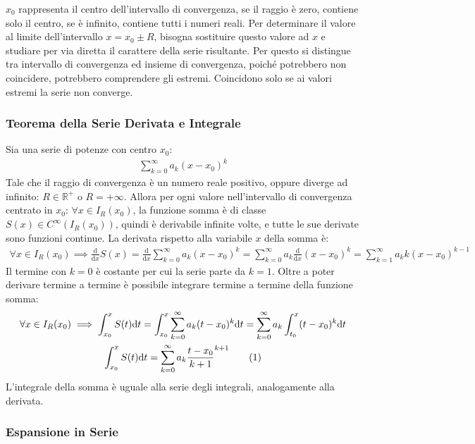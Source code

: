 \documentclass{article}
\numberwithin{equation}{subsection}
\newcommand{\tageq}{\tag{\stepcounter{equation}\theequation}}
\begin{document}
$x_0$ rappresenta il centro dell'intervallo di convergenza, se il raggio è zero, contiene solo il centro, se è infinito, contiene tutti i numeri reali. 
Per determinare il valore al limite dell'intervallo $x=x_0\pm R$, bisogna sostituire questo valore ad $x$ e studiare per via diretta il carattere della serie risultante. Per questo si distingue tra intervallo di convergenza ed insieme di convergenza, poiché potrebbero non coincidere, potrebbero comprendere gli estremi. Coincidono solo se ai valori estremi la serie non converge. 

\subsubsection{Teorema della Serie Derivata e Integrale}

Sia una serie di potenze con centro $x_0$:
\begin{gather*}
    \displaystyle\sum_{k=0}^\infty a_k(x-x_0)^k
\end{gather*}
Tale che il raggio di convergenza è un numero reale positivo, oppure diverge ad infinito: $R\in\mathbb{R}^+$ o $R=+\infty$. 
Allora per ogni valore nell'intervallo di convergenza centrato in $x_0$: 
$\forall x\in I_R(x_0)$, la funzione somma è di classe $S(x)\in C^{\infty}(I_R(x_0))$, quindi è derivabile infinite volte, e tutte le sue derivate sono funzioni continue. La derivata rispetto alla variabile $x$ della somma è:
\begin{gather}
    \forall x \in I_R(x_0)\implies\displaystyle\frac{\mathrm{d}}{\mathrm{d}x}S(x)=
    \frac{\mathrm{d}}{\mathrm{d}x}\sum_{k=0}^\infty a_k(x-x_0)^k=
    \sum_{k=0}^\infty a_k\frac{\mathrm{d}}{\mathrm{d}x}(x-x_0)^k=
    \sum_{k=1}^\infty a_kk(x-x_0)^{k-1}
\end{gather}
Il termine con $k=0$ è costante per cui la serie parte da $k=1$.
Oltre a poter derivare termine a termine è possibile integrare termine a termine della funzione somma:
\begin{gather*}
    \forall x\in I_R(x_0)\implies\displaystyle\int_{x_0}^xS(t)\mathrm{d}t=\int_{x_0}^x\sum_{k=0}^\infty a_k(t-x_0)^k\mathrm{d}t=\sum_{k=0}^\infty a_k\int_{t_0}^x(t-x_0)^k\mathrm{d}t\\
    \displaystyle\int_{x_0}^xS(t)\mathrm{d}t=
    \sum_{k=0}^\infty a_k\frac{t-x_0}{k+1}^{k+1}\tageq
\end{gather*}
L'integrale della somma è uguale alla serie degli integrali, analogamente alla derivata. 

\subsubsection{Espansione in Serie}
\end{document}
